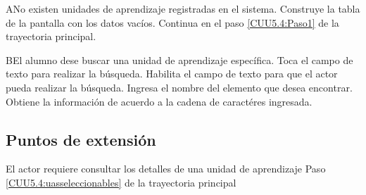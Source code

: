 	
	\begin{UCtrayectoriaA}{A}{No existen unidades de aprendizaje registradas en el sistema.}
		\UCpaso[\UCsist] Construye la tabla de la pantalla   con los datos vacíos.
		\UCpaso[] Continua en el paso \ref{CUU5.4:Paso1} de la trayectoria principal.
	\end{UCtrayectoriaA}
	
	\begin{UCtrayectoriaA}{B}{El alumno dese buscar una unidad de aprendizaje específica.}
		\UCpaso[\UCactor] Toca el campo de texto para realizar la búsqueda.
		\UCpaso[\UCsist] Habilita el campo de texto para que el actor pueda realizar la búsqueda.
		\UCpaso[\UCactor] Ingresa el nombre del elemento que desea encontrar.
		\UCpaso[\UCsist] Obtiene la información de acuerdo a la cadena de caractéres ingresada. 
	\end{UCtrayectoriaA}
	
	\subsection{Puntos de extensión}
	
	\UCExtensionPoint
	{El actor requiere consultar los detalles de una unidad de aprendizaje}
	{ Paso \ref{CUU5.4:uasseleccionables} de la trayectoria principal}
	{}
	

	
	
	
	
